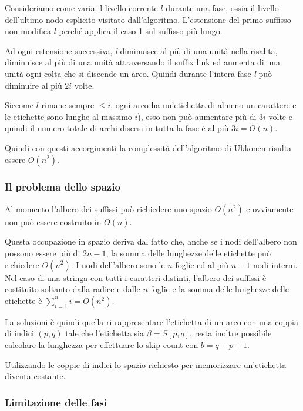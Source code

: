 Consideriamo come varia il livello corrente $l$ durante una fase, ossia il livello dell'ultimo nodo esplicito visitato dall'algoritmo.
L'estensione del primo suffisso non modifica $l$ perché applica il caso 1 sul suffisso più lungo. 

Ad ogni estensione successiva, \textit{l} diminuisce al più di una unità nella risalita, diminuisce al più di una unità attraversando il suffix link ed aumenta di una unità ogni colta che si discende un arco. Quindi durante l'intera fase \textit{l} può diminuire al più $2i$ volte.

Siccome $l$ rimane sempre $\leq i$, ogni arco ha un'etichetta di almeno un carattere e le etichette sono lunghe al massimo $i$), esso non può aumentare più di $3i$ volte e quindi il numero totale di archi discesi in tutta la fase è al più $3i = O(n)$.

Quindi con questi accorgimenti la complessità dell'algoritmo di Ukkonen risulta essere $O(n^2)$.

\subsubsection{Il problema dello spazio}

Al momento l'albero dei suffissi può richiedere uno spazio $O(n^2)$ e ovviamente non può essere costruito in $O(n)$.

Questa occupazione in spazio deriva dal fatto che, anche se i nodi dell'albero non possono essere più di $2n-1$, la somma delle lunghezze delle etichette può richiedere $O(n^2)$. I nodi dell'albero sono le $n$ foglie ed al più $n-1$ nodi interni. Nel caso di una stringa con tutti i caratteri distinti, l'albero dei suffissi è costituito soltanto dalla radice e dalle $n$ foglie e la somma delle lunghezze delle etichette è $\sum_{i=1}^n i = O(n^2)$.

La soluzioni è quindi quella ri rappresentare l'etichetta di un arco con una coppia di indici $(p,q)$ tale che l'etichetta sia $\beta = S[p,q]$, resta inoltre possibile calcolare la lunghezza per effettuare lo skip count con $b = q -p+1$.

Utilizzando le coppie di indici lo spazio richiesto per memorizzare un'etichetta diventa costante.

\subsubsection{Limitazione delle fasi}

